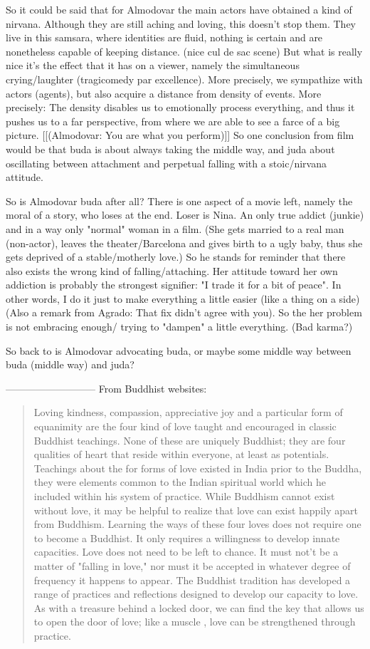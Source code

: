 \documentclass{book}
\begin{document}
So it could be said that for Almodovar the main actors have obtained a kind of nirvana. Although they are still aching and loving, this doesn't stop them. They live in this samsara, where identities are fluid, nothing is certain and are nonetheless capable of keeping distance. (nice cul de sac scene) But what is really nice it's the effect that it has on a viewer, namely the simultaneous crying/laughter (tragicomedy par excellence). More precisely, we sympathize with actors (agents), but also acquire a distance from density of events. More precisely: The density disables us to emotionally process everything, and thus it pushes us to a far perspective, from where we are able to see a farce of a big picture.
[[(Almodovar: You are what you perform)]]
So one conclusion from film would be that buda is about always taking the middle way, and juda about oscillating between attachment and perpetual falling with a stoic/nirvana attitude.

So is Almodovar buda after all? There is one aspect of a movie left, namely the moral of a story, who loses at the end. Loser is Nina. An only true addict (junkie) and in a way only "normal" woman in a film. (She gets married to a real man (non-actor), leaves the theater/Barcelona and gives birth to a ugly baby, thus she gets deprived of a stable/motherly love.) So he stands for reminder that there also exists the wrong kind of falling/attaching. Her attitude toward her own addiction is probably the strongest signifier: "I trade it for a bit of peace". In other words, I do it just to make everything a little easier (like a thing on a side) (Also a remark from Agrado: That fix didn't agree with you). So the her problem is not embracing enough/ trying to "dampen" a little everything. (Bad karma?)

So back to is Almodovar advocating buda, or maybe some middle way between buda (middle way) and juda?  

---------------------------
From Buddhist websites:
\begin{quotation}
Loving kindness, compassion, appreciative joy and a particular form of equanimity are the four kind of love taught and encouraged in classic Buddhist teachings. None of these are uniquely Buddhist; they are four qualities of heart that reside within everyone, at least as potentials. Teachings about the for forms of love existed in India prior to the Buddha, they were elements common to the Indian spiritual world which he included within his system of practice. While Buddhism cannot exist without love, it may be helpful to realize that love can exist happily apart from Buddhism. Learning the ways of these four loves does not require one to become a Buddhist. It only requires a willingness to develop innate capacities.
Love does not need to be left to chance. It must not't be a matter of "falling in love," nor must it be accepted in whatever degree of frequency it happens to appear. The Buddhist tradition has developed a range of practices and reflections designed to develop our capacity to love. As with a treasure behind a locked door, we can find the key that allows us to open the door of love; like a muscle , love can be strengthened through practice.
\end{quotation}
\end{document}
